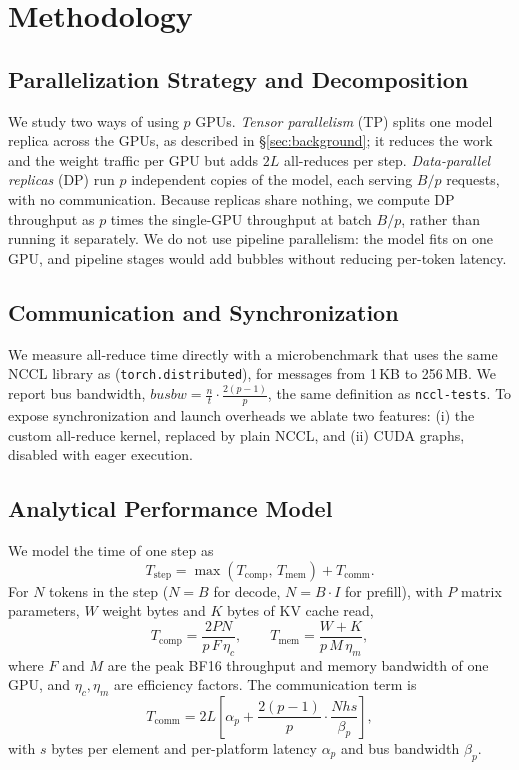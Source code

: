 \section{Methodology}
\label{sec:design}

\subsection{Parallelization Strategy and Decomposition}
We study two ways of using $p$ GPUs.
\emph{Tensor parallelism} (TP) splits one model replica across the GPUs, as described in
\S\ref{sec:background}; it reduces the work and the weight traffic per GPU but adds $2L$
all-reduces per step.
\emph{Data-parallel replicas} (DP) run $p$ independent copies of the model, each serving
$B/p$ requests, with no communication.
Because replicas share nothing, we compute DP throughput as $p$ times the single-GPU
throughput at batch $B/p$, rather than running it separately.
We do not use pipeline parallelism: the model fits on one GPU, and pipeline stages would
add bubbles without reducing per-token latency.

\subsection{Communication and Synchronization}
We measure all-reduce time directly with a microbenchmark that uses the same NCCL library as
\vllm (\texttt{torch.distributed}), for messages from 1\,KB to 256\,MB.
We report bus bandwidth, $\mathit{busbw} = \frac{n}{t}\cdot\frac{2(p-1)}{p}$, the same
definition as \texttt{nccl-tests}.
To expose synchronization and launch overheads we ablate two \vllm features:
(i) the custom all-reduce kernel, replaced by plain NCCL, and
(ii) CUDA graphs, disabled with eager execution.

\subsection{Analytical Performance Model}
We model the time of one step as
\begin{equation}
  T_{\mathrm{step}} = \max\left(T_{\mathrm{comp}},\, T_{\mathrm{mem}}\right) + T_{\mathrm{comm}} .
  \label{eq:step}
\end{equation}
For $N$ tokens in the step ($N=B$ for decode, $N=B\cdot I$ for prefill), with $P$ matrix
parameters, $W$ weight bytes and $K$ bytes of KV cache read,
\begin{equation}
  T_{\mathrm{comp}} = \frac{2PN}{p\,F\,\eta_c}, \qquad
  T_{\mathrm{mem}} = \frac{W + K}{p\,M\,\eta_m},
  \label{eq:compmem}
\end{equation}
where $F$ and $M$ are the peak BF16 throughput and memory bandwidth of one GPU, and
$\eta_c,\eta_m$ are efficiency factors.
The communication term is
\begin{equation}
  T_{\mathrm{comm}} = 2L\left[\alpha_p + \frac{2(p-1)}{p}\cdot\frac{N h s}{\beta_p}\right],
  \label{eq:comm}
\end{equation}
with $s$ bytes per element and per-platform latency $\alpha_p$ and bus bandwidth
$\beta_p$.

